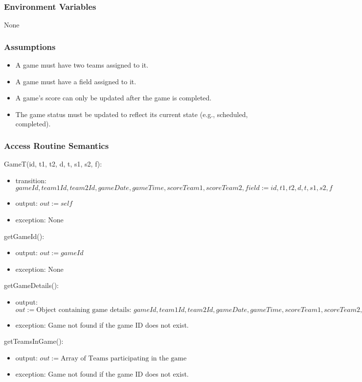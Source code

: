 \documentclass[12pt, titlepage]{article}
\begin{document}
\begin{itemize}
\subsubsection{Environment Variables}
None

\subsubsection{Assumptions}
\begin{itemize}
  \item A game must have two teams assigned to it.
  \item A game must have a field assigned to it.
  \item A game's score can only be updated after the game is completed.
  \item The game status must be updated to reflect its current state (e.g., scheduled, completed).
\end{itemize}

\subsubsection{Access Routine Semantics}

\noindent GameT(id, t1, t2, d, t, s1, s2, f):
\begin{itemize}
  \item transition: $gameId, team1Id, team2Id, gameDate, gameTime, scoreTeam1, scoreTeam2, field := id, t1, t2, d, t, s1, s2, f$
  \item output: $out := self$
  \item exception: None
\end{itemize}

\noindent getGameId():
\begin{itemize}
  \item output: $out := gameId$
  \item exception: None
\end{itemize}

\noindent getGameDetails():
\begin{itemize}
  \item output: $out := \text{Object containing game details: } gameId, team1Id, team2Id, gameDate, gameTime, scoreTeam1, scoreTeam2, status, field$
  \item exception: Game not found if the game ID does not exist.
\end{itemize}

\noindent getTeamsInGame():
\begin{itemize}
  \item output: $out := \text{Array of Teams participating in the game}$
  \item exception: Game not found if the game ID does not exist.
\end{itemize}


\end{itemize}
\end{document}
